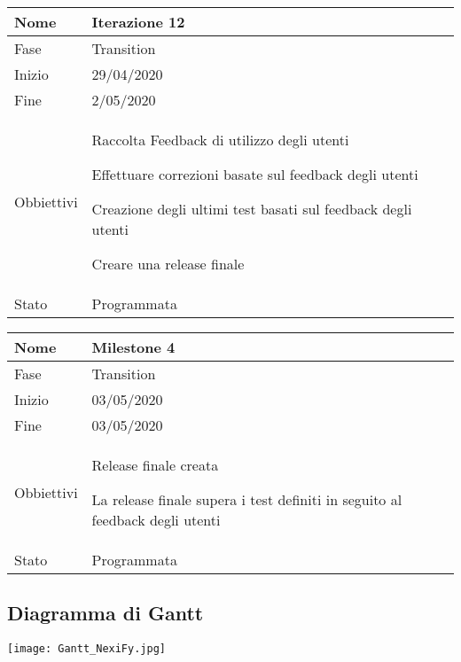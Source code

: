 \begin{center}
\begin{tabular}{ |p{2cm}|p{10cm}|  }
\hline
Nome & Iterazione 12 \\\hline
Fase & Transition \\\hline
Inizio & 29/04/2020 \\\hline
Fine &  2/05/2020  \\\hline
Obbiettivi & 
	\begin{compactitem}
		\item Raccolta Feedback di utilizzo degli utenti
		\item Effettuare correzioni basate sul feedback degli utenti
		\item Creazione degli ultimi test basati sul feedback degli utenti
		\item Creare una release finale
	\end{compactitem}\\\hline
Stato &  Programmata \\\hline
\end{tabular}
\label{table:12}\newline

\begin{tabular}{ |p{2cm}|p{10cm}|  }
\hline
Nome & Milestone 4\\\hline
Fase & Transition \\\hline
Inizio & 03/05/2020 \\\hline
Fine &  03/05/2020 \\\hline
Obbiettivi & 
	\begin{compactitem}
		\item Release finale creata
		\item La release finale supera i test definiti in seguito al feedback degli utenti
	\end{compactitem}\\\hline
Stato &  Programmata \\\hline
\end{tabular}
\label{table:milestone4}\newline


\end{center}

\subsection{Diagramma di Gantt}
\vspace{0.5cm}
\begin{center}
	\hspace*{-2cm}\texttt{[image: Gantt\_NexiFy.jpg]}
\end{center}
\vspace{2cm}

